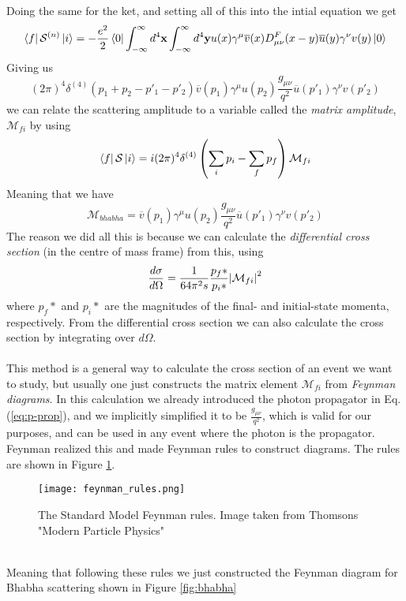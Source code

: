 \documentclass[12pt, a4paper]{book}
\begin{document}
Doing the same for the ket, and setting all of this into the intial equation we get
$$
\bra{f}\mathcal{S}^{(n)}\ket{i} = -\frac{e^2}{2}\bra{0}\int_{-\infty}^{\infty}d^4\mathbf{x} \int_{-\infty}^{\infty}d^4\mathbf{y} u(x)\gamma^\mu\overline{v}(x)D_{\mu\nu}^F(x-y)\overline{u}(y)\gamma^\nu v(y)\ket{0}
$$
Giving us
$$
(2\pi)^4\delta^{(4)}(p_1+p_2-p'_1-p'_2)\overline{v}(p_1)\gamma^\mu u(p_2) \frac{g_{\mu\nu}}{q^2}\overline{u}(p'_1)\gamma^\nu v(p'_2)
$$
we can relate the scattering amplitude to a variable called the \textit{matrix amplitude}, $\mathcal{M}_{fi}$ by using 
$$
\bra{f}\mathcal{S}\ket{i} = i(2\pi)^4\delta^{(4)}\left(\sum_i p_i -\sum_f p_f\right)\mathcal{M}_{fi}
$$
Meaning that we have
$$
\mathcal{M}_{bhabha} = \overline{v}(p_1)\gamma^\mu u(p_2) \frac{g_{\mu\nu}}{q^2}\overline{u}(p'_1)\gamma^\nu v(p'_2)
$$
The reason we did all this is because we can calculate the \textit{differential cross section} (in the centre of mass frame) from this, using
\begin{equation}\label{eq:diff_cross}
    \frac{d\sigma}{d\Omega} = \frac{1}{64\pi^2s}\frac{p_f*}{p_i*}\abs{\mathcal{M}_{fi}}^2
\end{equation}
where $p_f*$ and $p_i*$ are the magnitudes of the final- and initial-state momenta, respectively. From the differential cross section we can also calculate the cross section by integrating over $d\Omega$. \\
\\This method is a general way to calculate the cross section of an event we want to study, but usually one just constructs the matrix element $\mathcal{M}_{fi}$ from \textit{Feynman diagrams}. In this calculation we 
already introduced the photon propagator in Eq. (\ref{eq:p-prop}), and we implicitly simplified it to be $\frac{g_{\mu\nu}}{q^2}$, which is valid for our purposes, and can be used in any event where the photon is the propagator. 
Feynman realized this and made Feynman rules to construct diagrams. The rules are shown in Figure \ref{fig:feynman_rules}. \\
\graphicspath{{../../figures/}}
\begin{figure}[!ht]
    \centering
    \texttt{[image: feynman\_rules.png]}
    \caption[Standard Model Feynman Rules]{The Standard Model Feynman rules. Image taken from Thomsons "Modern Particle Physics" \cite{THOMSON}}\label{fig:feynman_rules}
\end{figure}
\\Meaning that following these rules we just constructed the Feynman diagram for Bhabha scattering shown in Figure \ref{fig:bhabha}
\end{document}
